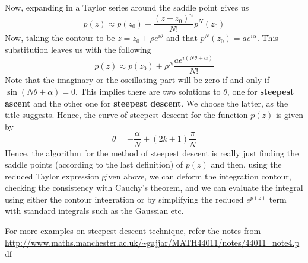 \documentclass[11pt]{article}
\begin{document}
\begin{sloppypar}
Now, expanding in a Taylor series around the saddle point gives us $$p(z) \approx p(z_0)+\frac{(z-z_0)^n}{N!}p^N(z_0)$$
Now, taking the contour to be $z = z_0 + \rho e^{i\theta}$ and that $p^N(z_0) = ae^{i\alpha}$. This substitution leaves us with the following
$$p(z) \approx p(z_0) + \rho^N \frac{ae^{i(N\theta + \alpha)}}{N!}$$
Note that the imaginary or the oscillating part will be zero if and only if $\sin(N\theta+\alpha) = 0$. This implies there are two solutions to $\theta$, one for \textbf{steepest ascent} and the other one for \textbf{steepest descent}. We choose the latter, as the title suggests. Hence, the curve of steepest descent for the function $p(z)$ is given by
$$\theta = -\frac{\alpha}{N} + (2k+1)\frac{\pi}{N}$$
Hence, the algorithm for the method of steepest descent is really just finding the saddle points (according to the last definition) of $p(z)$ and then, using the reduced Taylor expression given above, we can deform the integration contour, checking the consistency with Cauchy's theorem, and we can evaluate the integral using either the contour integration or by simplifying the reduced $e^{p(z)}$ term with standard integrals such as the Gaussian etc.

For more examples on steepest descent technique, refer the notes from 
\url{http://www.maths.manchester.ac.uk/~gajjar/MATH44011/notes/44011_note4.pdf}
\end{sloppypar}
\end{document}
